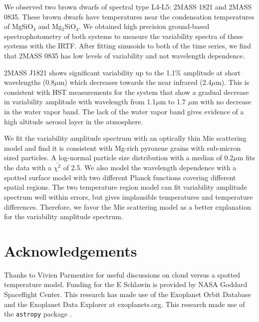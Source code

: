 \documentclass[twocolumn]{aastex6}
\begin{document}
We observed two brown dwarfs of spectral type L4-L5: 2MASS 1821 and 2MASS 0835.
These brown dwarfs have temperatures near the condensation temperatures of MgSiO$_3$ and Mg$_2$SiO$_4$.
We obtained high precision ground-based spectrophotometry of both systems to measure the variability spectra of these systems with the IRTF.
After fitting sinusoids to both of the time series, we find that 2MASS 0835 has low levels of variability and not wavelength dependence.

2MASS J1821 shows significant variability up to the 1.1\% amplitude at short wavelengths (0.8$\mu$m) which decreases towards the near infrared (2.4$\mu$m).
This is consistent with HST measurements for the system that show a gradual decrease in variability amplitude with wavelength \citep{yang2016exStormsBD} from 1.1$\mu$m to 1.7 $\mu$m with no decrease in the water vapor band.
The lack of the water vapor band gives evidence of a high altitude aerosol layer in the atmosphere.

We fit the variability amplitude spectrum with an optically thin Mie scattering model and find it is consistent with Mg-rich pyroxene grains with sub-micron sized particles.
A log-normal particle size distribution with a median of 0.2$\mu$m fits the data with a $\bar{\chi^2}$ of 2.5.
We also model the wavelength dependence with a spotted surface model with two different Planck functions covering different spatial regions.
The two temperature region model can fit variability amplitude spectrum well within errors, but gives implausible temperatures and temperature differences.
Therefore, we favor the Mie scattering model as a better explanation for the variability amplitude spectrum.

\section{Acknowledgements}
Thanks to Vivien Parmentier for useful discussions on cloud versus a spotted temperature model.
Funding for the E Schlawin is provided by NASA Goddard Spaceflight Center.
This research has made use of the Exoplanet Orbit Database and the Exoplanet Data Explorer at exoplanets.org.
This research made use of the \texttt{astropy} package \citep{astropy2013}.

\appendix
\end{document}
